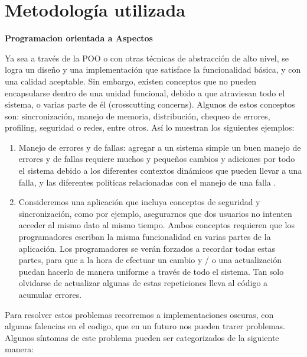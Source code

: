 \section{Metodología utilizada}
\label{sec:Methodology}

{\bf Programacion orientada a Aspectos }
		
Ya sea a través de la POO o con otras técnicas de abstracción de alto nivel, se
logra un diseño y una implementación que satisface la funcionalidad básica, y con
una calidad aceptable. Sin embargo, existen conceptos que no pueden encapsularse
dentro de una unidad funcional, debido a que atraviesan todo el sistema, o varias
parte de él (crosscutting concerns). Algunos de estos conceptos son: sincronización,
manejo de memoria, distribución, chequeo de errores, profiling, seguridad o redes,
entre otros. Así lo muestran los siguientes ejemplos:

\begin {enumerate}

	\item
	Manejo de errores y de fallas: agregar a un sistema simple un buen
	manejo de errores y de fallas requiere muchos y pequeños cambios y
	adiciones por todo el sistema debido a los diferentes contextos
	dinámicos que pueden llevar a una falla, y las diferentes políticas
	relacionadas con el manejo de una falla \cite{Kicz97a}.
	
	\item
	Consideremos una aplicación que incluya conceptos de seguridad y
	sincronización, como por ejemplo, asegurarnos que dos usuarios no
	intenten acceder al mismo dato al mismo tiempo. Ambos conceptos
	requieren que los programadores escriban la misma funcionalidad en
	varias partes de la aplicación. Los programadores se verán forzados a
	recordar todas estas partes, para que a la hora de efectuar un cambio
	y / o una actualización puedan hacerlo de manera uniforme a través
	de todo el sistema. Tan solo olvidarse de actualizar algunas de estas
	repeticiones lleva al código a acumular errores. \cite{Aquila}

\end{enumerate}

Para resolver estos problemas  recorremos a implementaciones oscuras, con
algunas falencias en el codigo, que en un futuro nos pueden trarer problemas.
Algunos síntomas de este problema pueden ser categorizados de la siguiente manera:

